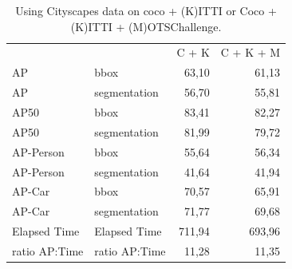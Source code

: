 \documentclass[11pt,a4paper,twocolumn,twoside]{article}
\begin{document}
\begin{table}[hbt]
\centering
\begin{tabularx}{\textwidth}{|l|l|r|r|} \cline{1-4}
              &               & \multicolumn{1}{l|}{C + K} & \multicolumn{1}{l|}{C + K + M} \\ \cline{1-4}
AP            & bbox          & 63,10                      & 61,13                          \\ \cline{1-4}
AP            & segmentation  & 56,70                      & 55,81                          \\ \cline{1-4}
AP50          & bbox          & 83,41                      & 82,27                          \\ \cline{1-4}
AP50          & segmentation  & 81,99                      & 79,72                          \\ \cline{1-4}
AP-Person     & bbox          & 55,64                      & 56,34                          \\ \cline{1-4}
AP-Person     & segmentation  & 41,64                      & 41,94                          \\ \cline{1-4}
AP-Car        & bbox          & 70,57                      & 65,91                          \\ \cline{1-4}
AP-Car        & segmentation  & 71,77                      & 69,68                          \\ \cline{1-4}
Elapsed Time  & Elapsed Time  & 711,94                     & 693,96                         \\ \cline{1-4}
ratio AP:Time & ratio AP:Time & 11,28                      & 11,35                          \\ \cline{1-4} 
\end{tabularx}
\caption{\label{table:task_b_coco_cityscapes_kittimots_motschallenge}Using Cityscapes data on coco + (K)ITTI or Coco + (K)ITTI + (M)OTSChallenge.}
\end{table}
\end{document}
